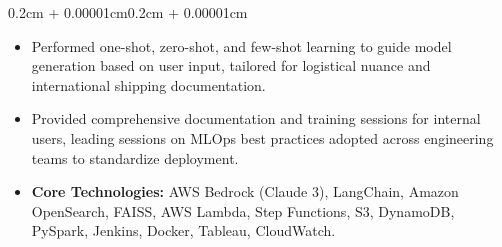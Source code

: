 \documentclass{article}
\newenvironment{highlights}{
    \begin{itemize}[
        topsep=0.10cm, 
        parsep=0.08cm, 
        partopsep=0pt, 
        itemsep=0.08cm, 
        leftmargin=0.4cm + 10pt
    ]
}{
    \end{itemize}
}
\newenvironment{onecolentry}{
    \begin{adjustwidth}{0.2cm + 0.00001cm}{0.2cm + 0.00001cm}
}{
    \end{adjustwidth}
}
\begin{document}
\begin{onecolentry}
\begin{highlights}
        \item Performed one-shot, zero-shot, and few-shot learning to guide model generation based on user input, tailored for logistical nuance and international shipping documentation.
        \item Provided comprehensive documentation and training sessions for internal users, leading sessions on MLOps best practices adopted across engineering teams to standardize deployment.
        \item \textbf{Core Technologies:} AWS Bedrock (Claude 3), LangChain, Amazon OpenSearch, FAISS, AWS Lambda, Step Functions, S3, DynamoDB, PySpark, Jenkins, Docker, Tableau, CloudWatch.
    \end{highlights}
\end{onecolentry}

\vspace{0.5cm}
\end{document}
